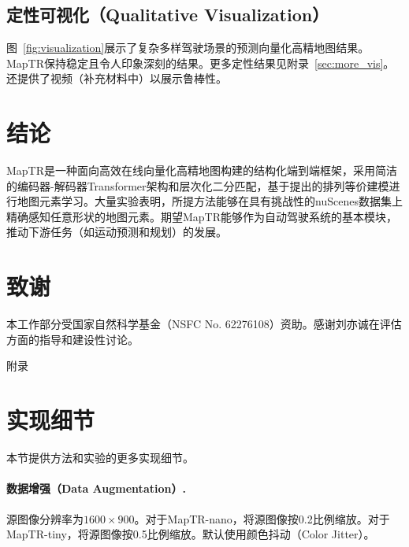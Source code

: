 \documentclass{article} %
\begin{document}
\vspace*{-0.15cm}
\subsection{定性可视化（Qualitative Visualization）}
图~\ref{fig:visualization}展示了复杂多样驾驶场景的预测向量化高精地图结果。MapTR保持稳定且令人印象深刻的结果。更多定性结果见附录~\ref{sec:more_vis}。还提供了视频（补充材料中）以展示鲁棒性。




\section{结论}
MapTR是一种面向高效在线向量化高精地图构建的结构化端到端框架，采用简洁的编码器-解码器Transformer架构和层次化二分匹配，基于提出的排列等价建模进行地图元素学习。大量实验表明，所提方法能够在具有挑战性的nuScenes数据集上精确感知任意形状的地图元素。期望MapTR能够作为自动驾驶系统的基本模块，推动下游任务（如运动预测和规划）的发展。


\section*{致谢}
本工作部分受国家自然科学基金（NSFC No. 62276108）资助。感谢刘亦诚在评估方面的指导和建设性讨论。






\newpage

\appendix
{\LARGE  附录}

\section{实现细节}
\label{sec:more_details}
本节提供方法和实验的更多实现细节。

\paragraph{数据增强（Data Augmentation）.}
源图像分辨率为$1600\times900$。对于MapTR-nano，将源图像按0.2比例缩放。对于MapTR-tiny，将源图像按0.5比例缩放。默认使用颜色抖动（Color Jitter）。
\end{document}
